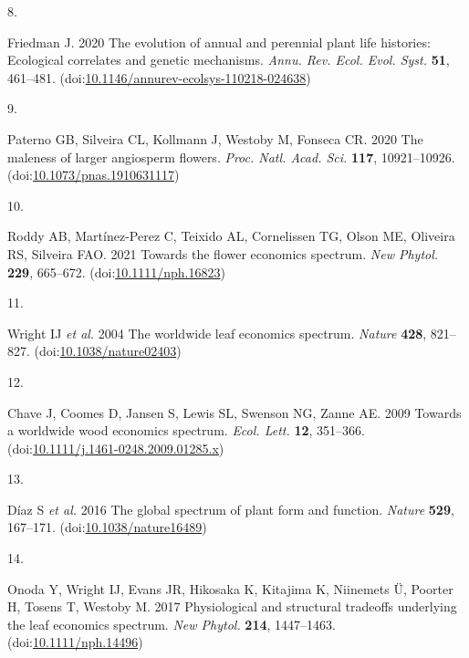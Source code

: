 \documentclass[
  12pt,
  a4paper,
]{article}
\newlength{\cslhangindent}
\newlength{\csllabelwidth}
\newlength{\cslentryspacingunit} %
\newenvironment{CSLReferences}[2] %
 {%
  \setlength{\parindent}{0pt}
  \ifodd #1
  \let\oldpar\par
  \def\par{\hangindent=\cslhangindent\oldpar}
  \fi
  \setlength{\parskip}{#2\cslentryspacingunit}
 }%
 {}
\newcommand{\CSLLeftMargin}[1]{\parbox[t]{\csllabelwidth}{#1}}
\newcommand{\CSLRightInline}[1]{\parbox[t]{\linewidth - \csllabelwidth}{#1}\break}
\begin{document}
\begin{CSLReferences}{0}{0}
\leavevmode{}%
\CSLLeftMargin{8. }
\CSLRightInline{Friedman J. 2020 The evolution of annual and perennial plant life histories: Ecological correlates and genetic mechanisms. \emph{Annu. Rev. Ecol. Evol. Syst.} \textbf{51}, 461--481. (doi:\href{https://doi.org/10.1146/annurev-ecolsys-110218-024638}{10.1146/annurev-ecolsys-110218-024638})}

\leavevmode{}%
\CSLLeftMargin{9. }
\CSLRightInline{Paterno GB, Silveira CL, Kollmann J, Westoby M, Fonseca CR. 2020 The maleness of larger angiosperm flowers. \emph{Proc. Natl. Acad. Sci.} \textbf{117}, 10921--10926. (doi:\href{https://doi.org/10.1073/pnas.1910631117}{10.1073/pnas.1910631117})}

\leavevmode{}%
\CSLLeftMargin{10. }
\CSLRightInline{Roddy AB, Martínez-Perez C, Teixido AL, Cornelissen TG, Olson ME, Oliveira RS, Silveira FAO. 2021 Towards the flower economics spectrum. \emph{New Phytol.} \textbf{229}, 665--672. (doi:\href{https://doi.org/10.1111/nph.16823}{10.1111/nph.16823})}

\leavevmode{}%
\CSLLeftMargin{11. }
\CSLRightInline{Wright IJ \emph{et al.} 2004 The worldwide leaf economics spectrum. \emph{Nature} \textbf{428}, 821--827. (doi:\href{https://doi.org/10.1038/nature02403}{10.1038/nature02403})}

\leavevmode{}%
\CSLLeftMargin{12. }
\CSLRightInline{Chave J, Coomes D, Jansen S, Lewis SL, Swenson NG, Zanne AE. 2009 Towards a worldwide wood economics spectrum. \emph{Ecol. Lett.} \textbf{12}, 351--366. (doi:\href{https://doi.org/10.1111/j.1461-0248.2009.01285.x}{10.1111/j.1461-0248.2009.01285.x})}

\leavevmode{}%
\CSLLeftMargin{13. }
\CSLRightInline{Díaz S \emph{et al.} 2016 The global spectrum of plant form and function. \emph{Nature} \textbf{529}, 167--171. (doi:\href{https://doi.org/10.1038/nature16489}{10.1038/nature16489})}

\leavevmode{}%
\CSLLeftMargin{14. }
\CSLRightInline{Onoda Y, Wright IJ, Evans JR, Hikosaka K, Kitajima K, Niinemets Ü, Poorter H, Tosens T, Westoby M. 2017 Physiological and structural tradeoffs underlying the leaf economics spectrum. \emph{New Phytol.} \textbf{214}, 1447--1463. (doi:\href{https://doi.org/10.1111/nph.14496}{10.1111/nph.14496})}


\end{CSLReferences}
\end{document}
